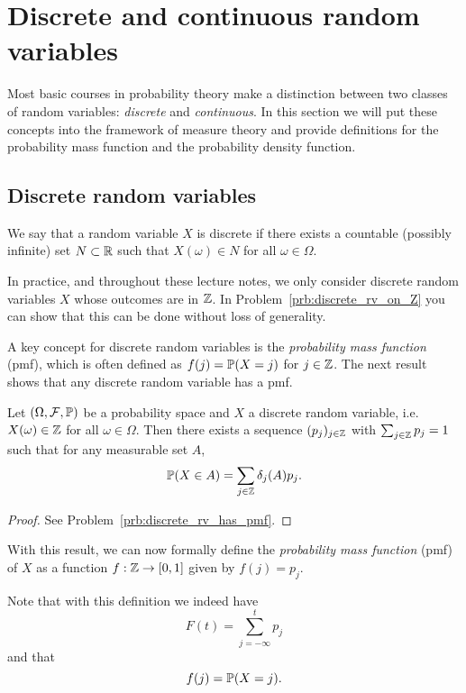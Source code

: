 \section{Discrete and continuous random variables}

Most basic courses in probability theory make a distinction between two classes of random variables: \emph{discrete} and \emph{continuous}. In this section we will put these concepts into the framework of measure theory and provide definitions for the probability mass function and the probability density function.

\subsection{Discrete random variables}
We say that a random variable $X$ is discrete if there exists a countable (possibly infinite) set $N \subset \mathbb R$ such that $X(\omega) \in N$ for all $\omega \in \Omega$. 

In practice, and throughout these lecture notes, we only consider discrete random variables $X$ whose outcomes are in $\mathbb Z$. In Problem~\ref{prb:discrete_rv_on_Z} you can show that this can be done without loss of generality. 

A key concept for discrete random variables is the \emph{probability mass function} (pmf), which is often defined as $f(j) = \mathbb P(X = j)$ for $j \in \mathbb Z$. The next result shows that any discrete random variable has a pmf.

\begin{lemma}\label{lem:existence_pmf}
Let $(\Omega, \mathcal F, \mathbb{P})$ be a probability space and $X$ a discrete random variable, i.e. $X(\omega) \in \mathbb Z$ for all $\omega \in \Omega$. Then there exists a sequence $(p_j)_{j \in \mathbb Z}$ with $\sum_{j \in \mathbb Z} p_j = 1$ such that for any measurable set $A$,
\[
	\mathbb P(X \in A) = \sum_{j \in \mathbb Z} \delta_j(A) p_j.
\]
\end{lemma}

\begin{proof}
See Problem~\ref{prb:discrete_rv_has_pmf}.
\end{proof}

With this result, we can now formally define the \emph{probability mass function} (pmf) of $X$ as a function $f : \mathbb Z \to [0,1]$ given by $f(j) = p_j$.

Note that with this definition we indeed have
\[
	F(t) = \sum_{j = -\infty}^t p_j
\]
and that
\[
	f(j) = \mathbb P(X = j).
\]

